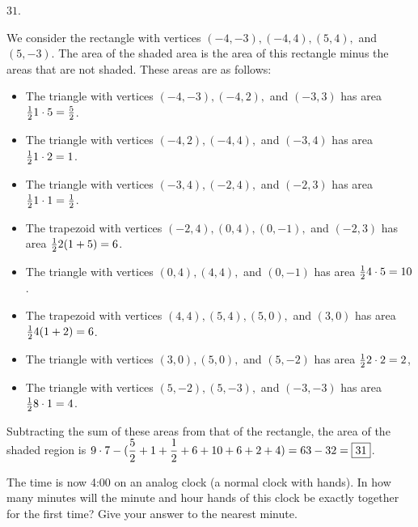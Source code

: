 \documentclass[11pt]{article}
\DeclareRobustCommand{\frac}[3][0pt]{%
  {\begingroup\hspace{#1}#2\hspace{#1}\endgroup\over\hspace{#1}#3\hspace{#1}}}
\begin{document}
\begin{answer} $\boxed{31}$. \end{answer}
\begin{solution}
We consider the rectangle with vertices $(-4, -3), (-4, 4), (5, 4),$ and $(5, -3)$. The area of the shaded area is the area of this rectangle minus the areas that are not shaded. These areas are as follows:
\begin{itemize}
	\item The triangle with vertices $(-4, -3), (-4, 2),$ and $(-3, 3)$ has area $\frac{1}{2} 1 \cdot 5 = \frac{5}{2}$.
	\item The triangle with vertices $(-4, 2), (-4, 4),$ and $(-3, 4)$ has area $\frac{1}{2} 1 \cdot 2 = 1$.
	\item The triangle with vertices $(-3, 4), (-2, 4),$ and $(-2, 3)$ has area $\frac{1}{2} 1 \cdot 1 = \frac{1}{2}$.
	\item The trapezoid with vertices $(-2, 4), (0, 4), (0, -1),$ and $(-2, 3)$ has area $\frac{1}{2} 2(1 + 5) = 6$.
	\item The triangle with vertices $(0, 4), (4, 4),$ and $(0, -1)$ has area $\frac{1}{2} 4 \cdot 5 = 10$.
	\item The trapezoid with vertices $(4, 4), (5, 4), (5, 0),$ and $(3, 0)$ has area $\frac{1}{2} 	4(1+2) = 6$.
	\item The triangle with vertices $(3, 0), (5, 0),$ and $(5, -2)$ has area $\frac{1}{2} 2 \cdot 2 = 2$,
	\item The triangle with vertices $(5, -2), (5, -3),$ and $(-3, -3)$ has area $\frac{1}{2} 8 \cdot 1 = 4$.
\end{itemize}
Subtracting the sum of these areas from that of the rectangle, the area of the shaded region is $\displaystyle 9 \cdot 7 - (\frac{5}{2} + 1 + \frac{1}{2} + 6 + 10 + 6 + 2 + 4) = 63 - 32 =\boxed{31}$.
\end{solution}

\begin{problem}
The time is now 4:00 on an analog clock (a normal clock with hands). In how many minutes will the minute and hour hands of this clock be exactly together for the first time? 
Give your answer to the nearest minute. 
\end{problem}
\end{document}
